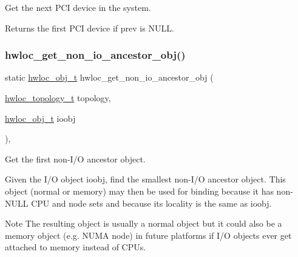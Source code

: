 Get the next P\+CI device in the system. 

\begin{DoxyReturn}{Returns}
the first P\+CI device if {\ttfamily prev} is {\ttfamily N\+U\+LL}. 
\end{DoxyReturn}
\mbox{\label{a00204_gaf139bb61375178e90cc3f1835b452ab6}} 
\subsubsection{\texorpdfstring{hwloc\+\_\+get\+\_\+non\+\_\+io\+\_\+ancestor\+\_\+obj()}{hwloc\_get\_non\_io\_ancestor\_obj()}}
{\footnotesize\ttfamily static \hyperlink{a00185_ga79b8ab56877ef99ac59b833203391c7d}{hwloc\+\_\+obj\+\_\+t} hwloc\+\_\+get\+\_\+non\+\_\+io\+\_\+ancestor\+\_\+obj (\begin{DoxyParamCaption}\item[{\hyperlink{a00186_ga9d1e76ee15a7dee158b786c30b6a6e38}{hwloc\+\_\+topology\+\_\+t}}]{topology,  }\item[{\hyperlink{a00185_ga79b8ab56877ef99ac59b833203391c7d}{hwloc\+\_\+obj\+\_\+t}}]{ioobj }\end{DoxyParamCaption})\hspace{0.3cm}{\ttfamily [inline]}, {\ttfamily [static]}}



Get the first non-\/\+I/O ancestor object. 

Given the I/O object {\ttfamily ioobj}, find the smallest non-\/\+I/O ancestor object. This object (normal or memory) may then be used for binding because it has non-\/\+N\+U\+LL C\+PU and node sets and because its locality is the same as {\ttfamily ioobj}.

\begin{DoxyNote}{Note}
The resulting object is usually a normal object but it could also be a memory object (e.\+g. N\+U\+MA node) in future platforms if I/O objects ever get attached to memory instead of C\+P\+Us. 
\end{DoxyNote}
\mbox{\label{a00204_gacdbaf0db98872e224b7883a84bfb0455}} 
